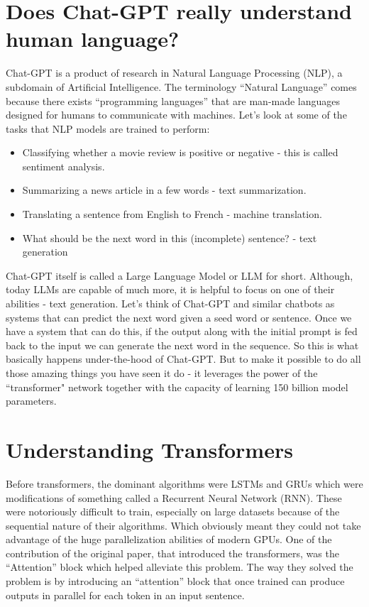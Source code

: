 \documentclass{../template/texnote}
\begin{document}
\section{Does Chat-GPT really understand human language?}
Chat-GPT is a product of research in Natural Language Processing (NLP), a subdomain of Artificial Intelligence.
The terminology ``Natural Language'' comes because there exists ``programming languages'' that are man-made languages designed for humans to communicate with machines.
Let's look at some of the tasks that NLP models are trained to perform: 
\begin{itemize}

\item Classifying whether a movie review is positive or negative - this is called sentiment analysis.
\item Summarizing a news article in a few words - text summarization.
\item Translating a sentence from English to French - machine translation.
\item What should be the next word in this (incomplete) sentence? - text generation%

\end{itemize}
Chat-GPT itself is called a Large Language Model or LLM for short. 
Although, today LLMs are capable of much more, it is helpful to focus on one of their abilities - text generation.
Let's think of Chat-GPT and similar chatbots as systems that can predict the next word given a seed word or sentence.
Once we have a system that can do this, if the output along with the initial prompt is fed back to the input we can generate the next word in the sequence.
So this is what basically happens under-the-hood of Chat-GPT.
But to make it possible to do all those amazing things you have seen it do - it leverages the power of the ``transformer" network together with the capacity of learning 
150 billion model parameters.


\section{Understanding Transformers}
Before transformers, the dominant algorithms were LSTMs and GRUs which were modifications of something called a Recurrent Neural Network (RNN).
These were notoriously difficult to train, especially on large datasets because of the sequential nature of their algorithms.
Which obviously meant they could not take advantage of the huge parallelization abilities of modern GPUs.
One of the contribution of the original paper, that introduced the transformers, was the ``Attention'' block which helped alleviate this problem.
The way they solved the problem is by introducing an ``attention'' block that once trained can produce outputs in parallel for each token in an input sentence.
\end{document}
